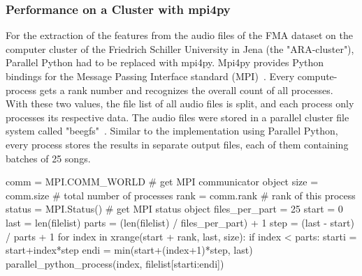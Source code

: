 \subsubsection{Performance on a Cluster with mpi4py}\label{mpi4py}

For the extraction of the features from the audio files of the FMA dataset on the computer cluster of the Friedrich Schiller University in Jena (the "ARA-cluster"), Parallel Python had to be replaced with mpi4py. 
Mpi4py provides Python bindings for the Message Passing Interface standard (MPI)~\cite{mpi4py}. 
Every compute-process gets a rank number and recognizes the overall count of all processes. With these two values, the file list of all audio files is split, and each process only processes its respective data. The audio files were stored in a parallel cluster file system called "beegfs"~\cite{beegfs}. Similar to the implementation using Parallel Python, every process stores the results in separate output files, each of them containing batches of 25 songs.\\

\begin{pythonCode}[frame=single,label={lst:mpi4py},caption={Mpi4py},captionpos=b]
comm = MPI.COMM_WORLD   # get MPI communicator object
size = comm.size        # total number of processes
rank = comm.rank        # rank of this process
status = MPI.Status()   # get MPI status object
files_per_part = 25
start = 0
last = len(filelist)
parts = (len(filelist) / files_per_part) + 1
step = (last - start) / parts + 1
for index in xrange(start + rank, last, size):
    if index < parts:        
        starti = start+index*step
        endi = min(start+(index+1)*step, last)
        parallel_python_process(index, filelist[starti:endi])
\end{pythonCode}

